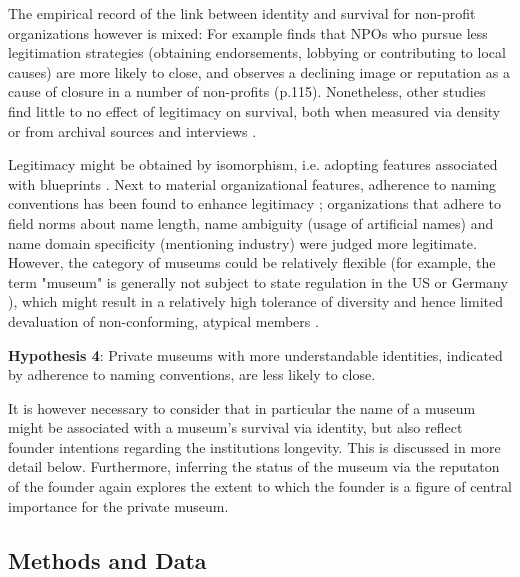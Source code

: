 \documentclass[12pt]{article}
\begin{document}
The empirical record of the link between identity and survival for non-profit organizations however is mixed: 
For example \textcite{Bielefeld_1994_survival} finds that NPOs who pursue less legitimation strategies (obtaining endorsements, lobbying or contributing to local causes) are more likely to close, and \textcite{HernandezOrtiz_2022_discontinuity} observes a declining image or reputation as a cause of closure in a number of non-profits (p.115).
Nonetheless, other studies find little to no effect of legitimacy on survival, both when measured via density \parencite{Bogaert_etal_2014_ecological} or from archival sources and interviews \parencite{Fernandez_2007_dissolution}.


Legitimacy might be obtained by isomorphism, i.e. adopting features associated with blueprints \parencite{diMaggio_1983_iron}.
Next to material organizational features, adherence to naming conventions has been found to enhance legitimacy \parencite{Glynn_Abzug_2002_names}; organizations that adhere to field norms about name length, name ambiguity (usage of artificial names) and name domain specificity (mentioning industry) were judged more legitimate. 
However, the category of museums could be relatively flexible (for example, the term "museum" is generally not subject to state regulation in the US or Germany \parencite{Museumsbund_ICOMDE_2006_standards,Lister_2023_marketing}), which might result in a relatively high tolerance of diversity and hence limited devaluation of non-conforming, atypical members \parencite{Bogaert_etal_2014_ecological}.


\bigbreak
\noindent
\textbf{Hypothesis 4}: Private museums with more understandable identities, indicated by adherence to naming conventions, are less likely to close. 


It is however necessary to consider that in particular the name of a museum might be associated with a museum's survival via identity, but also reflect founder intentions regarding the institutions longevity.
This is discussed in more detail below.
Furthermore, inferring the status of the museum via the reputaton of the founder again explores the extent to which the founder is a figure of central importance for the private museum.
\subsection*{Methods and Data}
\end{document}
